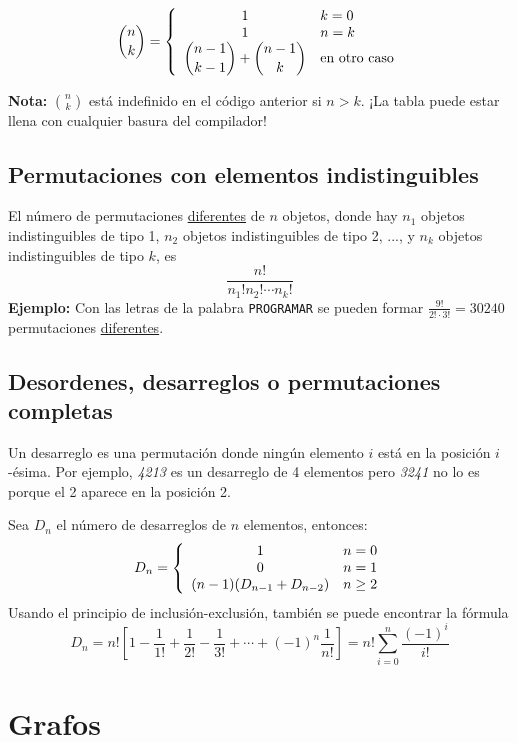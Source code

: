 \documentclass[10pt,letterpaper,twocolumn]{article}
\newcommand{\codigofuente}[1]{

\dotfill
}
\begin{document}
$$ \binom{n}{k} = \left\{
  \begin{array}{c l}
    1 & k = 0\\
    1 & n = k\\
    \displaystyle \binom{n - 1}{k - 1} + \binom{n - 1}{k} & \mbox{en otro caso}\\
  \end{array}
\right.
$$

\codigofuente{./src/combinatoria/pascal_triangle.cpp}

\bigskip
\textbf{Nota:} $ \binom{n}{k} $ está indefinido en el código anterior si $ n > k$. ¡La tabla puede estar llena con cualquier basura del compilador!

\subsection{Permutaciones con elementos indistinguibles}
El número de permutaciones \underline{diferentes} de $n$ objetos, donde hay $n_{1}$ objetos indistinguibles de tipo 1,
$n_{2}$ objetos indistinguibles de tipo 2, ..., y $n_{k}$ objetos indistinguibles de tipo $k$, es
$$
\frac{n!}{n_{1}!n_{2}! \cdots n_{k}!}
$$
\textbf{Ejemplo:} Con las letras de la palabra \texttt{PROGRAMAR} se pueden formar $ \displaystyle \frac{9!}{2! \cdot 3!} =
30240 $ permutaciones \underline{diferentes}.
\subsection{Desordenes, desarreglos o permutaciones completas}

Un desarreglo es una permutación donde ningún elemento $i$ está en la
posición $i$-ésima. Por ejemplo, \textit{4213} es un desarreglo de 4 elementos pero
\textit{3241} no lo es porque el 2 aparece en la posición 2.

Sea $D_{n}$ el número de desarreglos de $n$ elementos, entonces:
$$ {D_{n}} = \left\{
  \begin{array}{c l}
    1 & n = 0\\
    0 & n = 1\\
    (n-1)(D_{n-1} + D_{n-2}) & n \geq 2\\
  \end{array}
\right.
$$
Usando el principio de inclusión-exclusión, también se puede encontrar la fórmula
$$
D_{n} = n!\left [ 1 - \frac{1}{1!} + \frac{1}{2!} - \frac{1}{3!} + \cdots + (-1)^{n}\frac{1}{n!} \right ]
= n! \sum_{i=0}^{n} \frac{(-1)^{i}}{i!}
$$

\section{Grafos}
\end{document}
